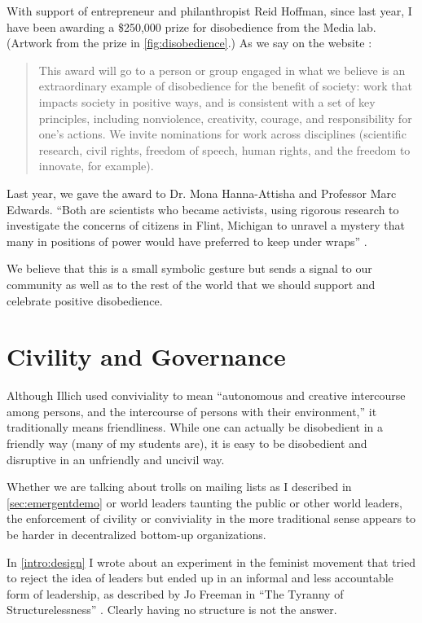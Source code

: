 With support of entrepreneur and philanthropist Reid Hoffman, since last year, I have been awarding a \$250,000 prize for disobedience from the Media lab. (Artwork from the prize in \autoref{fig:disobedience}.) As we say on the website \cite{disobedience2018}:

\begin{quote}
This award will go to a person or group engaged in what we believe is an extraordinary example of disobedience for the benefit of society: work that impacts society in positive ways, and is consistent with a set of key principles, including nonviolence, creativity, courage, and responsibility for one’s actions. We invite nominations for work across disciplines (scientific research, civil rights, freedom of speech, human rights, and the freedom to innovate, for example). 
\end{quote}

Last year, we gave the award to Dr. Mona Hanna-Attisha and Professor Marc Edwards. ``Both are scientists who became activists, using rigorous research to investigate the concerns of citizens in Flint, Michigan to unravel a mystery that many in positions of power would have preferred to keep under wraps'' \cite{disobedience2017}.

We believe that this is a small symbolic gesture but sends a signal to our community as well as to the rest of the world that we should support and celebrate positive disobedience.

\section{Civility and Governance}

Although Illich used conviviality to mean ``autonomous and creative intercourse among persons, and the intercourse of persons with their environment,'' it traditionally means friendliness. While one can actually be disobedient in a friendly way (many of my students are), it is easy to be disobedient and disruptive in an unfriendly and uncivil way.

Whether we are talking about trolls on mailing lists as I described in \autoref{sec:emergentdemo} or world leaders taunting the public or other world leaders, the enforcement of civility or conviviality in the more traditional sense appears to be harder in decentralized bottom-up organizations.

In \autoref{intro:design} I wrote about an experiment in the feminist movement that tried to reject the idea of leaders but ended up in an informal and less accountable form of leadership, as described by Jo Freeman in ``The Tyranny of Structurelessness'' \cite{freeman1972tyranny}. Clearly having no structure is not the answer.

